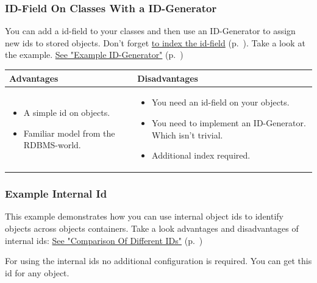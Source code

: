 \subsubsection*{ID-Field On Classes With a ID-Generator}

You can add a id-field to your classes and then use an ID-Generator to assign new ids to stored objects. Don't forget \hyperref[ref:basics-indexing]{to index the id-field} (p.~\pageref{ref:basics-indexing}). Take a look at the example. \hyperref[ref:platform-specific-issues-disconnected-objects-example-id-generator]{See "Example ID-Generator"} (p.~\pageref{ref:platform-specific-issues-disconnected-objects-example-id-generator})

{\small
\begin{longtable}{|p{}|p{}|}
\hline
\textbf{Advantages} & \textbf{Disadvantages} \\ \hline
\begin{itemize}
\item A simple id on objects.
\item Familiar model from the RDBMS-world.
\end{itemize} & \begin{itemize}
\item You need an id-field on your objects.
\item You need to implement an ID-Generator. Which isn't trivial.
\item Additional index required.
\end{itemize} \\ \hline
\end{longtable}}

\subsubsection{Example Internal Id}
\label{ref:platform-specific-issues-disconnected-objects-example-internal-id}

This example demonstrates how you can use internal object ids to identify objects across objects containers. Take a look advantages and disadvantages of internal ids: \hyperref[ref:platform-specific-issues-disconnected-objects-comparison-of-ids]{See "Comparison Of Different IDs"} (p.~\pageref{ref:platform-specific-issues-disconnected-objects-comparison-of-ids})

For using the internal ids no additional configuration is required. You can get this id for any object.

